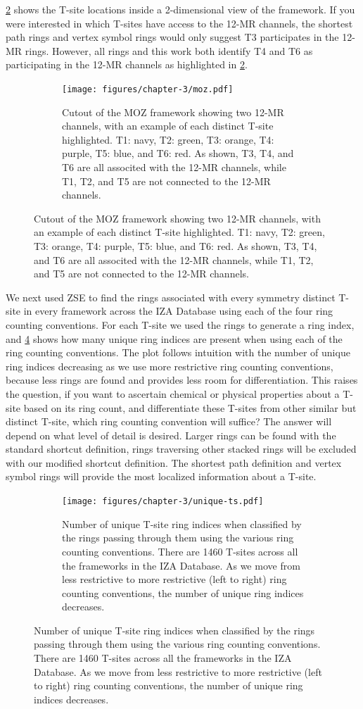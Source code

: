 \documentclass[preprint,numrefs,noinfo,sort&compress]{elsarticle}
\begin{document}
\cref{fig:moz} shows the T-site locations inside a 2-dimensional view of the framework. If you were interested in which T-sites have access to the 12-MR channels, the shortest path rings and vertex symbol rings would only suggest T3 participates in the 12-MR rings. However, all rings and this work both identify T4 and T6 as participating in the 12-MR channels as highlighted in \cref{fig:moz}. 

\begin{figure}
\begin{figure}[H]
\centering
\texttt{[image: figures/chapter-3/moz.pdf]}
\caption{Cutout of the MOZ framework showing two 12-MR channels, with an example of each distinct T-site highlighted. T1: navy, T2: green, T3: orange, T4: purple, T5: blue, and T6: red. As shown, T3, T4, and T6 are all associted with the 12-MR channels, while T1, T2, and T5 are not connected to the 12-MR channels. \label{fig:moz}}
\end{figure}
\end{figure}

We next used ZSE to find the rings associated with every symmetry distinct T-site in every framework across the IZA Database using each of the four ring counting conventions. For each T-site we used the rings to generate a ring index, and \cref{fig:unique-ts} shows how many unique ring indices are present when using each of the ring counting conventions. The plot follows intuition with the number of unique ring indices decreasing as we use more restrictive ring counting conventions, because less rings are found and provides less room for differentiation. This raises the question, if you want to ascertain chemical or physical properties about a T-site based on its ring count, and differentiate these T-sites from other similar but distinct T-site, which ring counting convention will suffice? The answer will depend on what level of detail is desired. Larger rings can be found with the standard shortcut definition, rings traversing other stacked rings will be excluded with our modified shortcut definition. The shortest path definition and vertex symbol rings will provide the most localized information about a T-site. 

\begin{figure}
\begin{figure}[H]
\centering
\texttt{[image: figures/chapter-3/unique-ts.pdf]}
\caption{Number of unique T-site ring indices when classified by the rings passing through them using the various ring counting conventions. There are 1460 T-sites across all the frameworks in the IZA Database. As we move from less restrictive to more restrictive (left to right) ring counting conventions, the number of unique ring indices decreases. \label{fig:unique-ts}}
\end{figure}
\end{figure}
\end{document}
